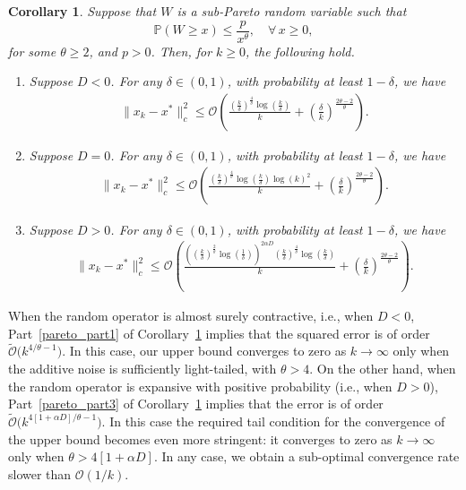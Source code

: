 \documentclass{article}
\newcommand{\lrp}[1]{\left( #1 \right)}
\newtheorem{corollary}{Corollary}[theorem]
\begin{document}
\begin{corollary}\label{cor:pareto}
    Suppose that $W$ is a sub-Pareto random variable such that
    \[ \mathbb{P}\lrp{W \ge x} \le \frac{p}{x^\theta}, \quad \forall \, x \ge 0, \] 
    for some $\theta \ge 2$, and $p > 0$.
    Then, %
    for $k \geq 0$, the following hold.
    \begin{enumerate}
    \item \label{pareto_part1} Suppose $D < 0$. For any $\delta\in(0,1)$, with probability at least $1-\delta$, we have
    \begin{align*}
        \|x_k - x^*\|^2_c \le {\mathcal{O}}\lrp{ \frac{\lrp{\frac{k}{\delta}}^{\frac{4}{\theta}}\log\left(\frac{k}{\delta}\right)   }{k} + \lrp{\frac{\delta}{k}}^\frac{2\theta - 2}{\theta} } .
    \end{align*}
    \item \label{pareto_part2} Suppose $D = 0$. For any $\delta\in(0,1)$, with probability at least $1-\delta$, we have 
    \begin{align*}
        \|x_k - x^*\|^2_c \le {\mathcal{O}}\lrp{ \frac{\lrp{\frac{k}{\delta}}^{\frac{4}{\theta}}\log\left(\frac{k}{\delta}\right) \log(k)^2   }{k} + \lrp{\frac{\delta}{k}}^\frac{2\theta - 2}{\theta} }.
    \end{align*}
    \item\label{pareto_part3} Suppose $D > 0$. For any $\delta\in(0,1)$, with probability at least $1-\delta$, we have 
    \begin{align*}
        \|x_k - x^*\|^2_c \le {\mathcal{O}}\lrp{ \frac{\lrp{\lrp{\frac{k}{\delta}}^\frac{2}{\theta} \log\left(\frac{1}{\delta}\right)}^{2\alpha D}\lrp{\frac{k}{\delta}}^{\frac{4}{\theta}}\log\left(\frac{k}{\delta}\right)   }{k} + \lrp{\frac{\delta}{k}}^\frac{2\theta - 2}{\theta} }.
    \end{align*}
    \end{enumerate}
\end{corollary}

When the random operator is almost surely contractive, i.e., when $D < 0$, Part~\ref{pareto_part1} of Corollary~\ref{cor:pareto} implies that the squared error is of order $\tilde{\mathcal{O}}\big(k^{4/\theta-1}\big)$. In this case, our upper bound converges to zero as $k\rightarrow \infty$ only when the additive noise is sufficiently light-tailed, with $\theta > 4$. On the other hand, when the random operator is expansive with positive probability (i.e., when $D > 0$), Part~\ref{pareto_part3} of Corollary~\ref{cor:pareto} implies that the error is of order $\tilde{\mathcal{O}}\big(k^{4[1+\alpha D]/\theta-1}\big)$. In this case the required tail condition for the convergence of the upper bound becomes even more stringent: it converges to zero as $k\rightarrow \infty$ only when $\theta > 4[1+\alpha D]$. In any case, we obtain a sub-optimal convergence rate slower than $\mathcal{O}(1/k)$.
\end{document}
